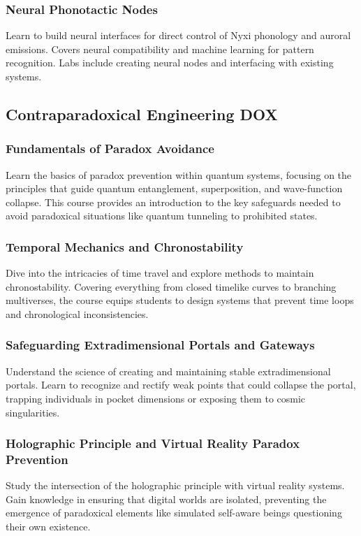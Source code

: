 \subsubsection{Neural Phonotactic Nodes}
Learn to build neural interfaces for direct control of Nyxi phonology and auroral emissions. Covers neural compatibility and machine learning for pattern recognition. Labs include creating neural nodes and interfacing with existing systems.


\subsection{Contraparadoxical Engineering \hfill DOX}
\subsubsection{Fundamentals of Paradox Avoidance}
Learn the basics of paradox prevention within quantum systems, focusing on the principles that guide quantum entanglement, superposition, and wave-function collapse. This course provides an introduction to the key safeguards needed to avoid paradoxical situations like quantum tunneling to prohibited states.
\subsubsection{Temporal Mechanics and Chronostability}
Dive into the intricacies of time travel and explore methods to maintain chronostability. Covering everything from closed timelike curves to branching multiverses, the course equips students to design systems that prevent time loops and chronological inconsistencies.
\subsubsection{Safeguarding Extradimensional Portals and Gateways}
Understand the science of creating and maintaining stable extradimensional portals. Learn to recognize and rectify weak points that could collapse the portal, trapping individuals in pocket dimensions or exposing them to cosmic singularities.
\subsubsection{Holographic Principle and Virtual Reality Paradox Prevention}
Study the intersection of the holographic principle with virtual reality systems. Gain knowledge in ensuring that digital worlds are isolated, preventing the emergence of paradoxical elements like simulated self-aware beings questioning their own existence.
